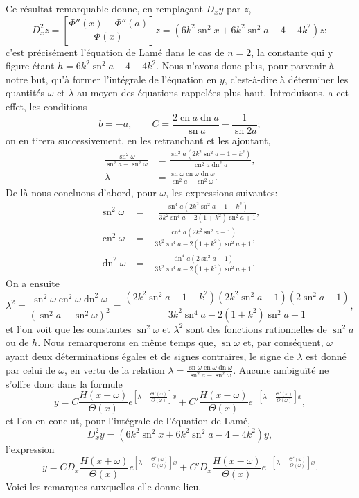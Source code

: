 \documentclass[11pt,leqno,oneside,letterpaper]{book}[2005/09/16]
\DeclareMathOperator{\sn}{sn}
\DeclareMathOperator{\cn}{cn}
\DeclareMathOperator{\dn}{dn}
\begin{document}
Ce r\'esultat remarquable donne, en rempla\c{c}ant $D_x y$ par $z$,
\[
D^2_x z = \left[ \frac{ \Phi''(x) - \Phi''(a) }{ \Phi(x) } \right] z
  = \left( 6k^2 \sn^2 x + 6k^2 \sn^2 a - 4 - 4k^2\right) z \colon
\]
c'est pr\'ecis\'ement l'\'equation de Lam\'e dans le cas de $n = 2$, la constante qui
y figure \'etant $h = 6k^2 \sn^2 a - 4 - 4k^2$. Nous n'avons donc plus, pour parvenir
\`a notre but, qu'\`a former l'int\'egrale de l'\'equation en $y$, c'est-\`a-dire
\`a d\'eterminer les quantit\'es $\omega$ et $\lambda$ au moyen des \'equations rappel\'ees plus
haut. Introduisons, a cet effet, les conditions
\[
b = -a,\qquad
C = \frac{2 \cn a \dn a}{\sn a} - \frac{1}{\sn 2a};
\]
on en tirera successivement, en les retranchant et les ajoutant,
\begin{align*}
\frac{\sn^2 \omega}{\sn^2 a- \sn^2 \omega} &= \frac{\sn^2 a \left(2k^2 \sn^2 a - 1 - k^2 \right)}{\cn^2 a \dn^2 a}, \\
\lambda &= \frac{\sn \omega \cn \omega \dn \omega}{\sn^2 a - \sn^2 \omega}.
\end{align*}
De l\`a nous concluons d'abord, pour $\omega$, les expressions suivantes:
\begin{align*}
\sn^2 \omega &=\phantom{-}\frac{\sn^4 a \left(2k^2 \sn^2 a - 1 - k^2 \right)}{
    3 k^2 \sn^4 a - 2(1 + k^2) \sn^2 a + 1}, \\
\cn^2 \omega &= -         \frac{\cn^4 a \left(2k^2 \sn^2 a - 1\right)}{
    3 k^2 \sn^4 a - 2(1 + k^2) \sn^2 a + 1}, \\
\dn^2 \omega &= -         \frac{\dn^4 a \left(2\sn^2 a - 1\right)}{
    3 k^2 \sn^4 a - 2(1+k^2)\sn^2 a + 1}.
\end{align*}
On a ensuite
\[
\lambda^2 = \frac{\sn^2 \omega \cn^2 \omega \dn^2 \omega}{ (\sn^2 a - \sn^2 \omega)^2 }
   = \frac{ (2 k^2 \sn^2 a - 1 - k^2)(2 k^2 \sn^2 a - 1)(2 \sn^2 a - 1) }
          { 3k^2 \sn^4 a - 2(1+k^2) \sn^2 a + 1},
\]
et l'on voit que les constantes $\sn^2 \omega$ et $\lambda^2$ sont des fonctions rationnelles
de $\sn^2 a$ ou de $h$. Nous remarquerons en m\^eme temps que, $\sn \omega$
et, par cons\'equent, $\omega$ ayant deux d\'eterminations \'egales et de signes contraires,
le signe de $\lambda$ est donn\'e par celui de $\omega$, en vertu de la relation
$\lambda = \frac{\sn \omega \cn \omega \dn \omega}{\sn^2 a - \sn^2 \omega}$. Aucune ambigu\"it\'e ne s'offre donc dans la formule
\[
y = C \frac{H(x + \omega)}{\Theta(x)}
    e^{ \left[ \lambda - \frac{\Theta'(\omega)}{\Theta(\omega)} \right] x }
  + C'\frac{H(x - \omega)}{\Theta(x)}
    e^{-\left[ \lambda - \frac{\Theta'(\omega)}{\Theta(\omega)} \right] x },
\]
et l'on en conclut, pour l'int\'egrale de l'\'equation de Lam\'e,
\[
D^2_x y = \left(6k^2 \sn^2 x + 6k^2 \sn^2 a - 4 - 4k^2 \right) y,
\]
l'expression
\[
y = C D_x \frac{H(x+\omega)}{\Theta(x)}
    e^{ \left[ \lambda - \frac{\Theta'(\omega)}{\Theta(\omega)} \right] x } +
    C'D_x \frac{H(x-\omega)}{\Theta(x)}
    e^{-\left[ \lambda - \frac{\Theta'(\omega)}{\Theta(\omega)} \right] x }.
\]
Voici les remarques auxquelles elle donne lieu.
\end{document}
